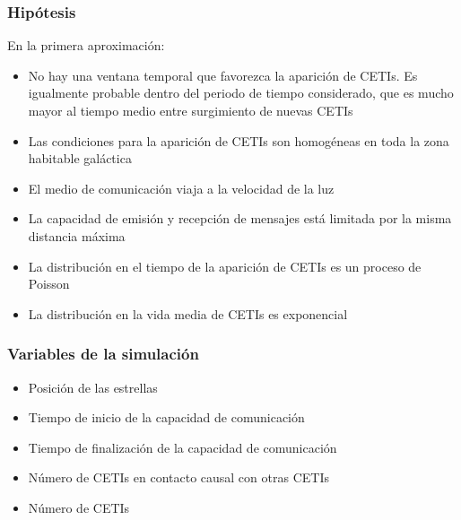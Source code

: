 \documentclass[handout]{beamer}
\theoremstyle{plain}
\theoremstyle{definition}
\theoremstyle{remark}
\begin{document}
 
\begin{frame}\frametitle{Hipótesis}

   En la primera aproximación:

   \begin{itemize}
      \item No hay una ventana temporal que favorezca la aparición de
         CETIs.   Es igualmente probable dentro del periodo de tiempo
         considerado, que es mucho mayor al tiempo medio entre
         surgimiento de nuevas CETIs
      \item Las condiciones para la aparición de CETIs son homogéneas
         en toda la zona habitable galáctica
      \item El medio de comunicación viaja a la velocidad de la luz
      \item La capacidad de emisión y recepción de mensajes está
         limitada por la misma distancia máxima
      \item La distribución en el tiempo de la aparición de CETIs es
         un proceso de Poisson
      \item La distribución en la vida media de CETIs es exponencial
   \end{itemize}

\end{frame}
                     



\begin{frame}\frametitle{Variables de la simulación}

   \begin{itemize}
      \item Posición de las estrellas
      \item Tiempo de inicio de la capacidad de comunicación
      \item Tiempo de finalización de la capacidad de comunicación
      \item Número de CETIs en contacto causal con otras CETIs
      \item Número de CETIs
   \end{itemize}

\end{frame}
               
\end{document}
